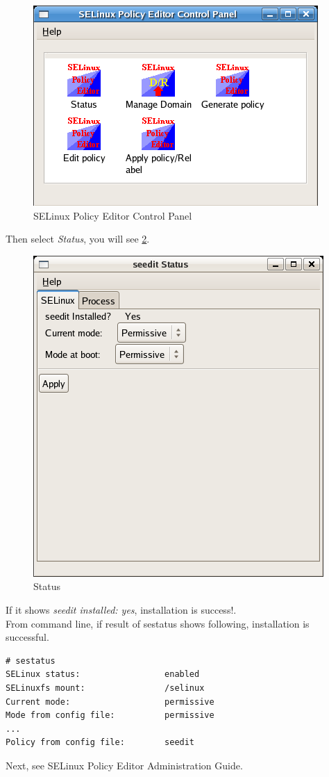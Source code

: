 \documentclass{article}
\begin{document}
\begin{figure}
\caption{SELinux Policy Editor Control Panel}\label{fig:controlpanel}
\includegraphics*{images/controlpanel.png}
\end{figure}

Then  select {\it Status}, you will see \ref{fig:status-selinux}.
\begin{figure}
\caption{Status}\label{fig:status-selinux}
\includegraphics{images/status-selinux.png}
\end{figure}
If it shows {\it seedit installed: yes}, installation is success!.\\

From command line, if result of sestatus shows following, installation
is successful.
\begin{verbatim}
# sestatus
SELinux status:                 enabled
SELinuxfs mount:                /selinux
Current mode:                   permissive
Mode from config file:          permissive
...
Policy from config file:        seedit	
\end{verbatim}

Next,  see SELinux Policy Editor Administration Guide.
\end{document}
